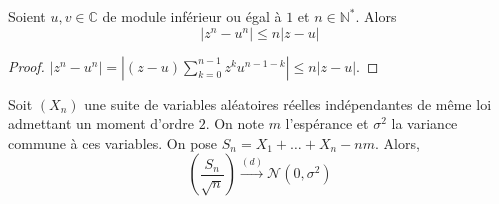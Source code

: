 
  \begin{lemma}
    \label{theoreme-central-limite-2}
    Soient $u, v \in \mathbb{C}$ de module inférieur ou égal à $1$ et $n \in \mathbb{N}^*$. Alors
    \[ |z^n - u^n| \leq n |z-u| \]
  \end{lemma}

  \begin{proof}
    $|z^n - u^n| = |(z-u) \sum_{k=0}^{n-1} z^k u^{n-1-k}| \leq n |z-u|$.
  \end{proof}

  \begin{theorem}
    Soit $(X_n)$ une suite de variables aléatoires réelles indépendantes de même loi admettant un moment d'ordre $2$. On note $m$ l'espérance et $\sigma^2$ la variance commune à ces variables. On pose $S_n = X_1 + \dots + X_n - nm$. Alors,
    \[ \left ( \frac{S_n}{\sqrt{n}} \right) \overset{(d)}{\longrightarrow} \mathcal{N}(0, \sigma^2) \]
  \end{theorem}

